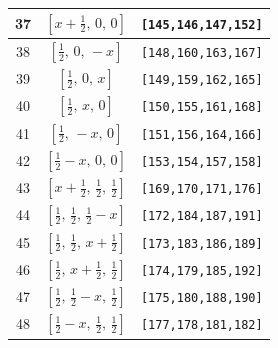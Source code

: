 \documentclass[fleqn,8pt]{jsarticle}
\begin{document}
\begin{longtable}{ccc}
37 & $\left[ x + \frac{1}{2},\, 0,\, 0 \right]$ & {\tt [145,146,147,152]} \\ \hline
38 & $\left[ \frac{1}{2},\, 0,\, - x \right]$ & {\tt [148,160,163,167]} \\ \hline
39 & $\left[ \frac{1}{2},\, 0,\, x \right]$ & {\tt [149,159,162,165]} \\ \hline
40 & $\left[ \frac{1}{2},\, x,\, 0 \right]$ & {\tt [150,155,161,168]} \\ \hline
41 & $\left[ \frac{1}{2},\, - x,\, 0 \right]$ & {\tt [151,156,164,166]} \\ \hline
42 & $\left[ \frac{1}{2} - x,\, 0,\, 0 \right]$ & {\tt [153,154,157,158]} \\ \hline
43 & $\left[ x + \frac{1}{2},\, \frac{1}{2},\, \frac{1}{2} \right]$ & {\tt [169,170,171,176]} \\ \hline
44 & $\left[ \frac{1}{2},\, \frac{1}{2},\, \frac{1}{2} - x \right]$ & {\tt [172,184,187,191]} \\ \hline
45 & $\left[ \frac{1}{2},\, \frac{1}{2},\, x + \frac{1}{2} \right]$ & {\tt [173,183,186,189]} \\ \hline
46 & $\left[ \frac{1}{2},\, x + \frac{1}{2},\, \frac{1}{2} \right]$ & {\tt [174,179,185,192]} \\ \hline
47 & $\left[ \frac{1}{2},\, \frac{1}{2} - x,\, \frac{1}{2} \right]$ & {\tt [175,180,188,190]} \\ \hline
48 & $\left[ \frac{1}{2} - x,\, \frac{1}{2},\, \frac{1}{2} \right]$ & {\tt [177,178,181,182]} \\
\end{longtable}
\renewcommand{\arraystretch}{1.2}
\end{document}

